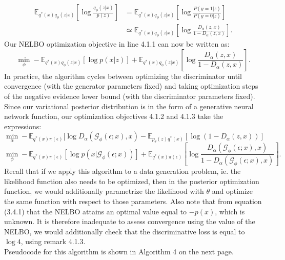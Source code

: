 \documentclass[honours,12pt]{unswthesis}
\numberwithin{equation}{section}
\theoremstyle{definition}
\begin{document}
\begin{align*}
\mathbb{E}_{q^*(x)q_\phi(z|x)}\left[\log \frac{q_\phi(z|x)}{p(z)}\right]&=\mathbb{E}_{q^*(x)q_\phi(z|x)}\left[\log \frac{P(y=1|z)}{P(y=0|z)}\right]\\
&\simeq \mathbb{E}_{q^*(x)q_\phi(z|x)}\left[\log \frac{D_\alpha(z,x)}{1-D_\alpha(z,x)}\right].
\end{align*}
Our NELBO optimization objective in line 4.1.1 can now be written as:
\begin{equation}
\min_\phi -\mathbb{E}_{q^*(x)q_\phi(z|x)}[\log p(x|z)]+\mathbb{E}_{q^*(x)q_\phi(z|x)}\left[\log \frac{D_\alpha(z,x)}{1-D_\alpha(z,x)}\right].
\end{equation}
In practice, the algorithm cycles between optimizing the discriminator until convergence (with the generator parameters fixed) and taking optimization steps of the negative evidence lower bound (with the discriminator parameters fixed).\\
Since our variational posterior distribution is in the form of a generative neural network function, our optimization objectives 4.1.2 and 4.1.3 take the expressions:
\[\min_\alpha -\mathbb{E}_{q^*(x)\pi(\epsilon)}[\log D_\alpha(\mathcal{G}_\phi(\epsilon;x),x)-\mathbb{E}_{p_\theta(z)q^*(x)}[\log (1-D_\alpha(z,x))]\]
\[\min_\phi -\mathbb{E}_{q^*(x)\pi (\epsilon)}[\log p(x|\mathcal{G}_\phi(\epsilon;x))]+\mathbb{E}_{q^*(x)\pi(\epsilon)}\left[\log \frac{D_\alpha(\mathcal{G}_\phi(\epsilon;x),x)}{1-D_\alpha(\mathcal{G}_\phi(\epsilon;x),x)}\right].\]
Recall that if we apply this algorithm to a data generation problem, ie. the likelihood function also needs to be optimized, then in the posterior optimization function, we would additionally parametrize the likelihood with $\theta$ and optimize the same function with respect to those parameters. Also note that from equation (3.4.1) that the NELBO attains an optimal value equal to $-p(x)$, which is unknown. It is therefore inadequate to assess convergence using the value of the NELBO, we would additionally check that the discriminative loss is equal to $\log 4$, using remark 4.1.3.\\
Pseudocode for this algorithm is shown in Algorithm 4 on the next page.
\newpage
\end{document}
